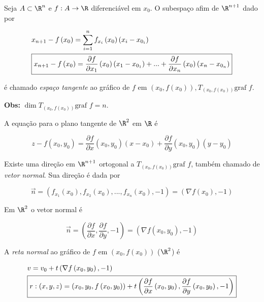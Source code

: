 \documentclass[11pt, oneside, a4paper]{gsm-l}
\begin{document}
\begin{defi}
    Seja $A \subset \R^n$ e $f:A \to \R$ diferenciável em $x_0$. O subespaço afim de $\R^{n + 1}$ dado por

\[
\begin{gathered}
  x_{n + 1}  - f\left( {x_0 } \right) = \sum\limits_{i = 1}^n {f_{x_i } \left( {x_0 } \right)\left( {x_i  - x_{0_i } } \right)}  \hfill \\
\boxed{x_{n + 1}  - f\left( {x_0 } \right) = \frac{{\partial f}}
{{\partial x_1 }}\left( {x_0 } \right)\left( {x_1  - x_{0_1 } } \right) + ... + \frac{{\partial f}}
{{\partial x_n }}\left( {x_0 } \right)\left( {x_n  - x_{0_n } } \right) \hfill }\\
\end{gathered}
\]

    é chamado \textit{espaço tangente} ao gráfico de $f$ em $\left( {x_0 ,f\left( {x_0 } \right)} \right),T_{\left( {x_0 ,f\left( {x_0 } \right)} \right)} {\text{graf }}f$.

    \textbf{Obs:} $\dim T_{\left( {x_0 ,f\left( {x_0 } \right)} \right)} {\text{graf }}f = n$.

A equação para o plano tangente de $\R^2$ em $\R$ é

\[\boxed{
z - f\left( {x_0 ,y_0 } \right) = \frac{{\partial f}}
    {{\partial x}}\left( {x_0 ,y_0 } \right)\left( {x - x_0 } \right) + \frac{{\partial f}}
{{\partial y}}\left( {x_0 ,y_0 } \right)\left( {y - y_0 } \right)}
\]

    Existe uma direção em $\R^{n + 1}$ ortogonal a $T_{\left( {x_0 ,f\left( {x_0 } \right)} \right)} {\text{graf }}f$, também chamado de \textit{vetor normal}. Sua direção é dada por

\[
    \overrightarrow n  = \left( {f_{x_1 } \left( {x_0 } \right),f_{x_2 } \left( {x_0 } \right),...,f_{x_n } \left( {x_0 } \right), - 1} \right) = \left( {\nabla f\left( {x_0 } \right), - 1} \right)
\]

Em $\R^2$ o vetor normal é

\[
\overrightarrow n  = \left( {\frac{{\partial f}}
{{\partial x}},\frac{{\partial f}}
    {{\partial y}}, - 1} \right) = \left( {\nabla f\left( {x_0 ,y_0 } \right), - 1} \right)
\]

    A \textit{reta normal} ao gráfico de $f$ em $\left( {x_0 ,f\left( {x_0 } \right)} \right)$ ($\R^2$) é

\[
\begin{gathered}
      v = v_0  + t\left( {\nabla f\left( {x_0 ,y_0 } \right), - 1} \right) \hfill \\
      \boxed{r: \left( {x,y,z} \right) = \left( {x_0 ,y_0 ,f\left( {x_0 ,y_0 } \right)} \right) + t\left( {\frac{{\partial f}}
{{\partial x}}\left( {x_0 ,y_0 } \right),\frac{{\partial f}}
{{\partial y}}\left( {x_0 ,y_0 } \right), - 1} \right) \hfill} \\
\end{gathered}
\]

\end{defi}
\end{document}
